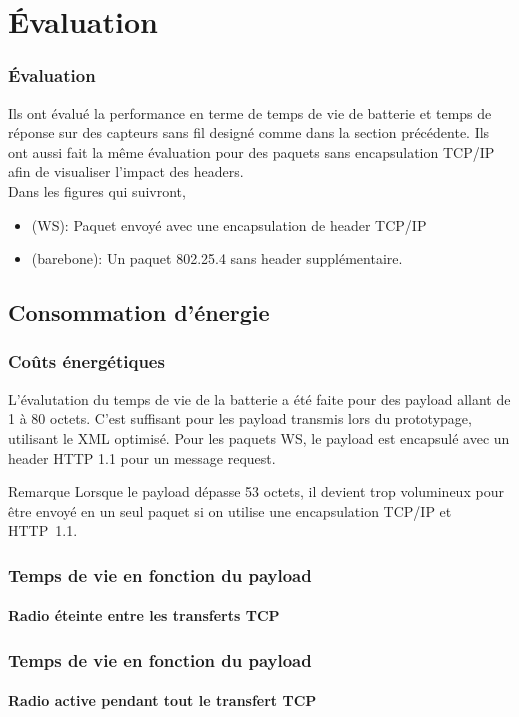 \section{Évaluation}
\begin{frame}
\frametitle{Évaluation}
Ils ont évalué la performance en terme de temps de vie de batterie et temps de réponse sur des capteurs sans fil designé comme dans la section précédente.
Ils ont aussi fait la même évaluation pour des paquets sans encapsulation TCP/IP afin de visualiser l'impact des headers.\\
\vspace{5mm}
Dans les figures qui suivront,
\begin{itemize}
 \item (WS): Paquet envoyé avec une encapsulation de header TCP/IP %
 \item (barebone): Un paquet 802.25.4 sans header supplémentaire.
\end{itemize}
\end{frame}

\subsection{Consommation d'énergie}
\begin{frame}
 \frametitle{Coûts énergétiques}
 L'évalutation du temps de vie de la batterie a été faite pour des payload allant de 1 à 80 octets.
 C'est suffisant pour les payload transmis lors du prototypage, utilisant le XML optimisé.
 Pour les paquets WS, le payload est encapsulé avec un header HTTP 1.1 pour un message request.
 \begin{block}{Remarque}
  Lorsque le payload dépasse 53 octets, il devient trop volumineux pour être envoyé en un seul paquet si on utilise une encapsulation TCP/IP et HTTP~1.1.
 \end{block}
\end{frame}

\begin{frame}
 \frametitle{Temps de vie en fonction du payload}
 \framesubtitle{Radio éteinte entre les transferts TCP}
\end{frame}

\begin{frame}
 \frametitle{Temps de vie en fonction du payload}
 \framesubtitle{Radio active pendant tout le transfert TCP}
\end{frame}

